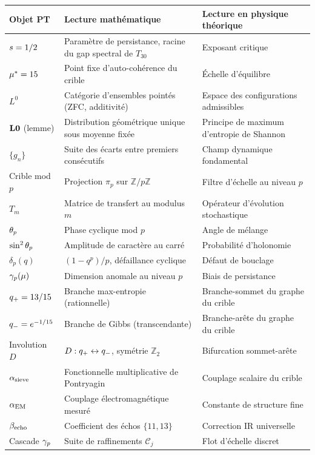 \begin{table}[htbp]
\centering
\small
\begin{tabular}{@{}p{3.7cm}p{5cm}p{5cm}@{}}
\toprule
Objet PT & Lecture mathématique & Lecture en physique théorique \\
\midrule
$s = 1/2$ & Paramètre de persistance, racine du gap spectral de $T_{30}$ & Exposant critique \\
$\mu^{*} = 15$ & Point fixe d'auto-cohérence du crible & Échelle d'équilibre \\
$L^0$ & Catégorie d'ensembles pointés (ZFC, additivité) & Espace des configurations admissibles \\
$\textbf{L0}$ (lemme) & Distribution géométrique unique sous moyenne fixée & Principe de maximum d'entropie de Shannon \\
$\{g_n\}$ & Suite des écarts entre premiers consécutifs & Champ dynamique fondamental \\
Crible mod $p$ & Projection $\pi_p$ sur $\mathbb{Z}/p\mathbb{Z}$ & Filtre d'échelle au niveau $p$ \\
$T_m$ & Matrice de transfert au modulus $m$ & Opérateur d'évolution stochastique \\
$\theta_{p}$ & Phase cyclique mod $p$ & Angle de mélange \\
$\sin^{2}\theta_{p}$ & Amplitude de caractère au carré & Probabilité d'holonomie \\
$\delta_p(q)$ & $(1 - q^p)/p$, défaillance cyclique & Défaut de bouclage \\
$\gamma_{p}(\mu)$ & Dimension anomale au niveau $p$ & Biais de persistance \\
$q_{+} = 13/15$ & Branche max-entropie (rationnelle) & Branche-sommet du graphe du crible \\
$q_{-} = e^{-1/15}$ & Branche de Gibbs (transcendante) & Branche-arête du graphe du crible \\
Involution $D$ & $D : q_{+} \leftrightarrow q_{-}$, symétrie $\mathbb{Z}_2$ & Bifurcation sommet-arête \\
$\alpha_{\rm sieve}$ & Fonctionnelle multiplicative de Pontryagin & Couplage scalaire du crible \\
$\alpha_{\rm EM}$ & Couplage électromagnétique mesuré & Constante de structure fine \\
$\beta_{\rm echo}$ & Coefficient des échos $\{11, 13\}$ & Correction IR universelle \\
Cascade $\gamma_{p}$ & Suite de raffinements $\mathcal C_j$ & Flot d'échelle discret \\
\bottomrule
\end{tabular}
\end{table}
